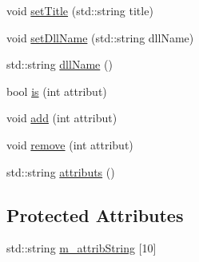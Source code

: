 \begin{DoxyCompactItemize}
\item 
void \hyperlink{classObject_a89557dbbad5bcaa02652f5d7fa35d20f}{setTitle} (std::string title)
\item 
void \hyperlink{classObject_a870c5af919958c2136623b2d7816d123}{setDllName} (std::string dllName)
\item 
std::string \hyperlink{classObject_a2e3947f2870094c332d7454117f3ec63}{dllName} ()
\item 
bool \hyperlink{classAttrib_a704f26af560909ad22065083bb7d4c34}{is} (int attribut)
\item 
void \hyperlink{classAttrib_a235f773af19c900264a190b00a3b4ad7}{add} (int attribut)
\item 
void \hyperlink{classAttrib_a7d4ef7e32d93cb287792b87b857e79f3}{remove} (int attribut)
\item 
std::string \hyperlink{classAttrib_aee7bbf16b144887f196e1341b24f8a26}{attributs} ()
\end{DoxyCompactItemize}
\subsection*{Protected Attributes}
\begin{DoxyCompactItemize}
\item 
std::string \hyperlink{classAttrib_a3414521d7a82476e874b25a5407b5e63}{m\_\-attribString} \mbox{[}10\mbox{]}
\end{DoxyCompactItemize}
